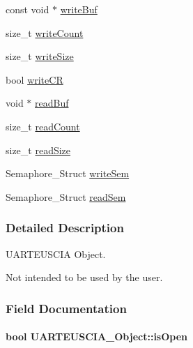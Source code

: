 \begin{DoxyCompactItemize}
const void $\ast$ \hyperlink{struct_u_a_r_t_e_u_s_c_i_a___object_a1bded79263900ea6d78a72709b5aa335}{write\-Buf}
\item 
size\-\_\-t \hyperlink{struct_u_a_r_t_e_u_s_c_i_a___object_afd15a8419bfe376197e0701d1a95848f}{write\-Count}
\item 
size\-\_\-t \hyperlink{struct_u_a_r_t_e_u_s_c_i_a___object_af5b40a1295f842f0c92a2c32d0c51a8c}{write\-Size}
\item 
bool \hyperlink{struct_u_a_r_t_e_u_s_c_i_a___object_aea9d042f8873c67a91522ad6195f3a11}{write\-C\-R}
\item 
void $\ast$ \hyperlink{struct_u_a_r_t_e_u_s_c_i_a___object_a56c5f482d19cd62719e933984c775efe}{read\-Buf}
\item 
size\-\_\-t \hyperlink{struct_u_a_r_t_e_u_s_c_i_a___object_a14152735a1233c10b0323ed9e8db73b5}{read\-Count}
\item 
size\-\_\-t \hyperlink{struct_u_a_r_t_e_u_s_c_i_a___object_a012cc439c2053feea7019ffe985cf8b8}{read\-Size}
\item 
Semaphore\-\_\-\-Struct \hyperlink{struct_u_a_r_t_e_u_s_c_i_a___object_a7d580f915e87c3a315401f488d0ce1d4}{write\-Sem}
\item 
Semaphore\-\_\-\-Struct \hyperlink{struct_u_a_r_t_e_u_s_c_i_a___object_a5bd9e0e33dcb2c8a2004fb920f745fe5}{read\-Sem}
\end{DoxyCompactItemize}


\subsubsection{Detailed Description}
U\-A\-R\-T\-E\-U\-S\-C\-I\-A Object. 

Not intended to be used by the user. 

\subsubsection{Field Documentation}
\paragraph[{is\-Open}]{\setlength{\rightskip}{0pt plus 5cm}bool U\-A\-R\-T\-E\-U\-S\-C\-I\-A\-\_\-\-Object\-::is\-Open}\label{struct_u_a_r_t_e_u_s_c_i_a___object_a876bd31eb61666ec63ac78411407ce84}
